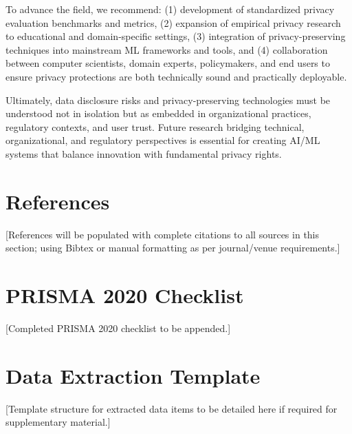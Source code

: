 \documentclass[11pt,a4paper]{article}
\begin{document}
To advance the field, we recommend: (1) development of standardized privacy evaluation benchmarks and metrics, (2) expansion of empirical privacy research to educational and domain-specific settings, (3) integration of privacy-preserving techniques into mainstream ML frameworks and tools, and (4) collaboration between computer scientists, domain experts, policymakers, and end users to ensure privacy protections are both technically sound and practically deployable.

Ultimately, data disclosure risks and privacy-preserving technologies must be understood not in isolation but as embedded in organizational practices, regulatory contexts, and user trust. Future research bridging technical, organizational, and regulatory perspectives is essential for creating AI/ML systems that balance innovation with fundamental privacy rights.

\section*{References}

[References will be populated with complete citations to all sources in this section; using Bibtex or manual formatting as per journal/venue requirements.]

\appendix

\section{PRISMA 2020 Checklist}

[Completed PRISMA 2020 checklist to be appended.]

\section{Data Extraction Template}

[Template structure for extracted data items to be detailed here if required for supplementary material.]
\end{document}
